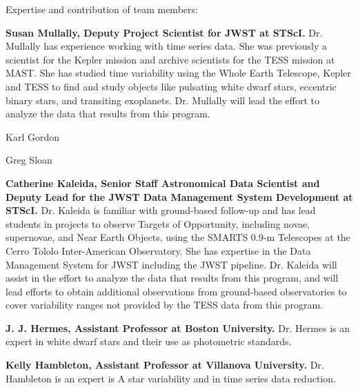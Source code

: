 Expertise and contribution of team members:

\textbf{Susan Mullally, Deputy Project Scientist for JWST at STScI.} Dr. Mullally has experience working with time series data. She was previously a scientist for the Kepler mission and archive scientists for the TESS mission at MAST.  She has studied time variability using the Whole Earth Telescope, Kepler and TESS to find and study objects like pulsating white dwarf stars, eccentric binary stars, and transiting exoplanets.  Dr. Mullally will lead the effort to analyze the data that results from this program.


Karl Gordon


Greg Sloan


\textbf{Catherine Kaleida, Senior Staff Astronomical Data Scientist and Deputy Lead for the JWST Data Management System Development at  STScI.}  Dr. Kaleida is familiar with ground-based follow-up and has lead students in projects to observe Targets of Opportunity, including novae, supernovae, and Near Earth Objects, using the SMARTS 0.9-m Telescopes at the Cerro Tololo Inter-American Observatory.  She has expertise in the Data Management System for JWST including the JWST pipeline. Dr. Kaleida will assist in the effort to analyze the data that results from this program, and will lead efforts to obtain additional observations from ground-based observatories to cover variability ranges not provided by the TESS data from this program.

\textbf{J. J. Hermes, Assistant Professor at Boston University.} Dr. Hermes is an expert in white dwarf stars and their use as photometric standards.  

\textbf{Kelly Hambleton, Assistant Professor at Villanova University.} Dr. Hambleton is an expert is A star variability and in time series data reduction.

